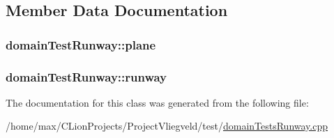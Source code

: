 \subsection{Member Data Documentation}
\subsubsection[{\texorpdfstring{plane}{plane}}]{ domain\+Test\+Runway\+::plane\hspace{0.3cm}{\ttfamily [protected]}}\hypertarget{classdomainTestRunway_a07ee8922d98b061f71e90864d97ea677}{}\label{classdomainTestRunway_a07ee8922d98b061f71e90864d97ea677}
\subsubsection[{\texorpdfstring{runway}{runway}}]{ domain\+Test\+Runway\+::runway\hspace{0.3cm}{\ttfamily [protected]}}\hypertarget{classdomainTestRunway_ab997db3448cfbd94f07a82de2b9145d1}{}\label{classdomainTestRunway_ab997db3448cfbd94f07a82de2b9145d1}


The documentation for this class was generated from the following file\+:\begin{DoxyCompactItemize}
\item 
/home/max/\+C\+Lion\+Projects/\+Project\+Vliegveld/test/\hyperlink{domainTestsRunway_8cpp}{domain\+Tests\+Runway.\+cpp}\end{DoxyCompactItemize}
